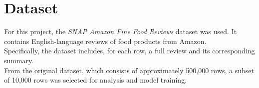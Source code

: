 \section{Dataset}
For this project, the \textit{SNAP Amazon Fine Food Reviews} dataset\cite{datasetkaggle}\cite{datasetpaper} was used. It contains English-language reviews of food products from Amazon.\\
Specifically, the dataset includes, for each row, a full review and its corresponding summary.\\
From the original dataset, which consists of approximately 500,000 rows, a subset of 10,000 rows was selected for analysis and model training.
